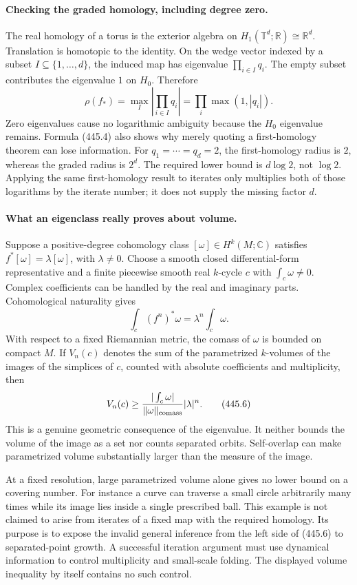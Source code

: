 \documentclass[11pt]{article}
\begin{document}
\paragraph{Checking the graded homology, including degree zero.}
The real homology of a torus is the exterior algebra on $H_1(\mathbb T^d;\mathbb R)\cong\mathbb R^d$. Translation is homotopic to the identity. On the wedge vector indexed by a subset $I\subseteq\{1,\ldots,d\}$, the induced map has eigenvalue $\prod_{i\in I}q_i$. The empty subset contributes the eigenvalue $1$ on $H_0$. Therefore
\[
 \rho(f_*)=\max_I\left|\prod_{i\in I}q_i\right|
          =\prod_i\max(1,|q_i|).
 \tag{445.4}
\]
Zero eigenvalues cause no logarithmic ambiguity because the $H_0$ eigenvalue remains. Formula (445.4) also shows why merely quoting a first-homology theorem can lose information. For $q_1=\cdots=q_d=2$, the first-homology radius is $2$, whereas the graded radius is $2^d$. The required lower bound is $d\log2$, not $\log2$. Applying the same first-homology result to iterates only multiplies both of those logarithms by the iterate number; it does not supply the missing factor $d$.

\paragraph{What an eigenclass really proves about volume.}
Suppose a positive-degree cohomology class $[\omega]\in H^k(M;\mathbb C)$ satisfies $f^*[\omega]=\lambda[\omega]$, with $\lambda\ne0$. Choose a smooth closed differential-form representative and a finite piecewise smooth real $k$-cycle $c$ with $\int_c\omega\ne0$. Complex coefficients can be handled by the real and imaginary parts. Cohomological naturality gives
\[
 \int_c(f^n)^*\omega=\lambda^n\int_c\omega.
 \tag{445.5}
\]
With respect to a fixed Riemannian metric, the comass of $\omega$ is bounded on compact $M$. If $V_n(c)$ denotes the sum of the parametrized $k$-volumes of the images of the simplices of $c$, counted with absolute coefficients and multiplicity, then
\[
 V_n(c)\ge
 \frac{|\int_c\omega|}{\|\omega\|_{\rm comass}}|\lambda|^n.
 \tag{445.6}
\]
This is a genuine geometric consequence of the eigenvalue. It neither bounds the volume of the image as a set nor counts separated orbits. Self-overlap can make parametrized volume substantially larger than the measure of the image.

At a fixed resolution, large parametrized volume alone gives no lower bound on a covering number. For instance a curve can traverse a small circle arbitrarily many times while its image lies inside a single prescribed ball. This example is not claimed to arise from iterates of a fixed map with the required homology. Its purpose is to expose the invalid general inference from the left side of (445.6) to separated-point growth. A successful iteration argument must use dynamical information to control multiplicity and small-scale folding. The displayed volume inequality by itself contains no such control.
\end{document}
